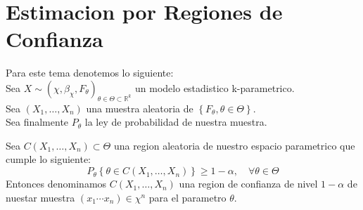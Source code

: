 \section{Estimacion por Regiones de Confianza}

Para este tema denotemos lo siguiente:\\
Sea $X \sim (\chi, \beta_\chi, F_\theta)_{\theta \in \Theta \subset \mathbb{R}^k}$ un modelo estadistico k-parametrico.\\
Sea $(X_1, \ldots, X_n)$ una muestra aleatoria de $\left\{ F_\theta, \theta \in \Theta \right\}$.\\
Sea finalmente $P_\theta$ la ley de probabilidad de nuestra muestra.\\

\begin{definición}
    Sea $C(X_1, \ldots, X_n) \subset \Theta$ una region aleatoria de nuestro espacio parametrico que cumple lo siguiente:\\
    $$ P_\theta \left\{ \theta \in C(X_1, \ldots, X_n) \right\} \geq 1 - \alpha, \quad \forall \theta \in \Theta $$
    Entonces denominamos $C(X_1, \ldots, X_n)$ una region de confianza de nivel $1 - \alpha$ de nuestar muestra $(x_1 \cdots x_n) \in \chi^n$ para el parametro $\theta$.\\
\end{definición}